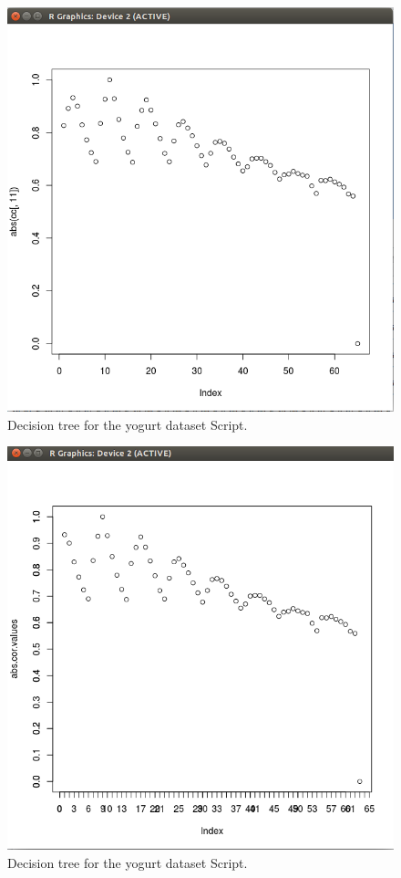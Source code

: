 \documentclass[12pt, letterpaper]{article}
\begin{document}
\begin{figure}[H]
\centering
\includegraphics[width=5.0in]{yogurtplot1}
\caption{Decision tree for the yogurt dataset Script.}
\label{fig:dtyd}
\end{figure}

\begin{figure}[H]
\centering
\includegraphics[width=5.0in]{yogurtplot2}
\caption{Decision tree for the yogurt dataset Script.}
\label{fig:dtyd}
\end{figure}
\end{document}
